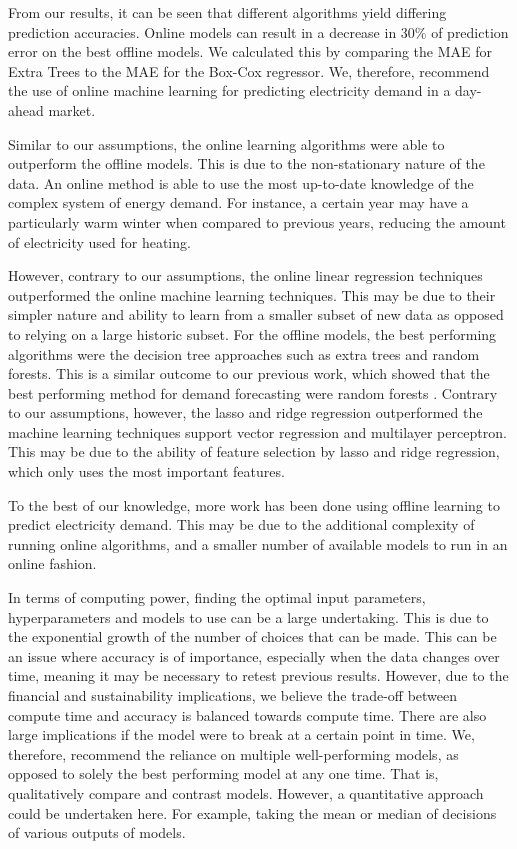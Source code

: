 
From our results, it can be seen that different algorithms yield differing prediction accuracies. Online models can result in a decrease in 30\% of prediction error on the best offline models. We calculated this by comparing the MAE for Extra Trees to the MAE for the Box-Cox regressor. We, therefore, recommend the use of online machine learning for predicting electricity demand in a day-ahead market.

Similar to our assumptions, the online learning algorithms were able to outperform the offline models. This is due to the non-stationary nature of the data. An online method is able to use the most up-to-date knowledge of the complex system of energy demand. For instance, a certain year may have a particularly warm winter when compared to previous years, reducing the amount of electricity used for heating.

However, contrary to our assumptions, the online linear regression techniques outperformed the online machine learning techniques. This may be due to their simpler nature and ability to learn from a smaller subset of new data as opposed to relying on a large historic subset. For the offline models, the best performing algorithms were the decision tree approaches such as extra trees and random forests. This is a similar outcome to our previous work, which showed that the best performing method for demand forecasting were random forests \cite{Kell2018a}. Contrary to our assumptions, however, the lasso and ridge regression outperformed the machine learning techniques support vector regression and multilayer perceptron. This may be due to the ability of feature selection by lasso and ridge regression, which only uses the most important features.

To the best of our knowledge, more work has been done using offline learning to predict electricity demand. This may be due to the additional complexity of running online algorithms, and a smaller number of available models to run in an online fashion.

In terms of computing power, finding the optimal input parameters, hyperparameters and models to use can be a large undertaking. This is due to the exponential growth of the number of choices that can be made. This can be an issue where accuracy is of importance, especially when the data changes over time, meaning it may be necessary to retest previous results. However, due to the financial and sustainability implications, we believe the trade-off between compute time and accuracy is balanced towards compute time. There are also large implications if the model were to break at a certain point in time. We, therefore, recommend the reliance on multiple well-performing models, as opposed to solely the best performing model at any one time. That is, qualitatively compare and contrast models. However, a quantitative approach could be undertaken here. For example, taking the mean or median of decisions of various outputs of models. 

